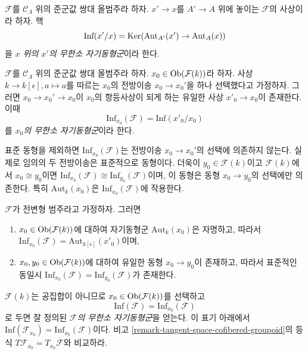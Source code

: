 \begin{definition}
\label{definition-relative-infinitesimal-auts}
$\mathcal{F}$를 $\mathcal C_\Lambda$ 위의 준군값 쌍대 올범주라 하자.
$x' \to x$를 $A' \to A$ 위에 놓이는 $\mathcal{F}$의 사상이라 하자. 핵
$$
\text{Inf}(x'/x) = \mathop{\mathrm{Ker}}(\text{Aut}_{A'}(x') \to \text{Aut}_A(x))
$$
을 {\it $x$ 위의 $x'$의 무한소 자기동형군}이라 한다.
\end{definition}

\begin{definition}
\label{definition-infinitesimal-auts}
$\mathcal{F}$를 $\mathcal C_\Lambda$ 위의 준군값 쌍대 올범주라 하자.
$x_0 \in \mathop{\mathrm{Ob}}\nolimits(\mathcal{F}(k))$라 하자. 사상
$k \to k[\epsilon], a \mapsto a$를 따르는 $x_0$의 전방이송
$x_0 \to x_0'$을 하나 선택했다고 가정하자.
그러면 $x_0 \to x_0' \to x_0$이 $x_0$의 항등사상이 되게 하는
유일한 사상 $x'_0 \to x_0$이 존재한다. 이때
$$
\text{Inf}_{x_0}(\mathcal F) = \text{Inf}(x'_0/x_0)
$$
를 {\it $x_0$의 무한소 자기동형군}이라 한다.
\end{definition}

\begin{remark}
\label{remark-choice-pushforward-immaterial-infinitesimal-aut}
표준 동형을 제외하면 $\text{Inf}_{x_0}(\mathcal{F})$는 전방이송
$x_0 \to x_0'$의 선택에 의존하지 않는다. 실제로 임의의 두 전방이송은
표준적으로 동형이다. 더욱이 $y_0 \in \mathcal{F}(k)$이고
$\mathcal{F}(k)$에서 $x_0 \cong y_0$이면
$\text{Inf}_{x_0}(\mathcal{F}) \cong \text{Inf}_{y_0}(\mathcal{F})$이며,
이 동형은 동형 $x_0 \to y_0$의 선택에만 의존한다. 특히
$\text{Aut}_k(x_0)$은 $\text{Inf}_{x_0}(\mathcal{F})$에 작용한다.
\end{remark}

\begin{remark}
\label{remark-trivial-aut-point}
$\mathcal{F}$가 전변형 범주라고 가정하자. 그러면
\begin{enumerate}
\item $x_0 \in \mathop{\mathrm{Ob}}\nolimits(\mathcal{F}(k))$에 대하여 자기동형군
$\text{Aut}_k(x_0)$은 자명하고, 따라서
$\text{Inf}_{x_0}(\mathcal{F}) = \text{Aut}_{k[\epsilon]}(x'_0)$이며,
\item $x_0, y_0 \in \mathop{\mathrm{Ob}}\nolimits(\mathcal{F}(k))$에 대하여 유일한 동형
$x_0 \to y_0$이 존재하고, 따라서 표준적인 동일시
$\text{Inf}_{x_0}(\mathcal{F}) = \text{Inf}_{y_0}(\mathcal{F})$가 존재한다.
\end{enumerate}
$\mathcal{F}(k)$는 공집합이 아니므로 $x_0 \in \mathop{\mathrm{Ob}}\nolimits(\mathcal{F}(k))$를
선택하고
$$
\text{Inf}(\mathcal{F}) = \text{Inf}_{x_0}(\mathcal{F})
$$
로 두면 잘 정의된 {\it $\mathcal{F}$의 무한소 자기동형군}을 얻는다.
이 표기 아래에서
$\text{Inf}(\mathcal{F}_{x_0}) = \text{Inf}_{x_0}(\mathcal{F})$이다.
비고 \ref{remark-tangent-space-cofibered-groupoid}의 등식
$T\mathcal{F}_{x_0} = T_{x_0}\mathcal{F}$와 비교하라.
\end{remark}


